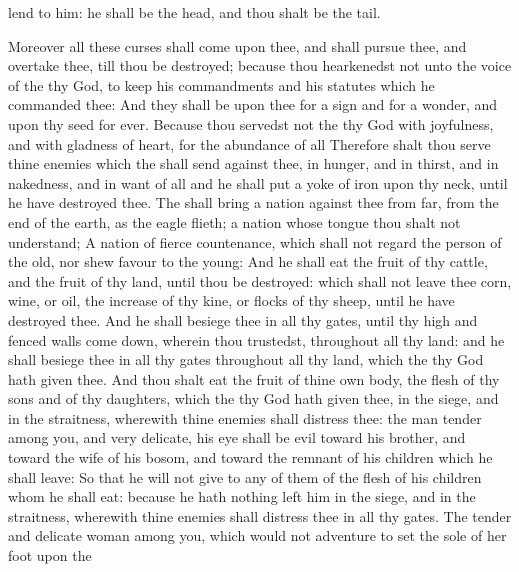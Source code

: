 {lend to him: he shall be the
head, and thou shalt be the
tail.
\par }{\PP {}Moreover all these
curses shall
come upon thee, and shall
pursue thee, and
overtake thee, till thou be
destroyed; because thou
hearkenedst not unto the
voice of the
{} thy
God, to
keep his
commandments and his
statutes which he
commanded thee:
And they shall be upon thee for a
sign and for a
wonder, and upon thy
seed
for
ever.
Because thou
servedst not the
{} thy
God with
joyfulness, and with
gladness of
heart, for the
abundance of all
{}
Therefore shalt thou
serve thine
enemies which the
{} shall
send against thee, in
hunger, and in
thirst, and in
nakedness, and in
want of all
{} and he shall
put a
yoke of
iron upon thy
neck, until he have
destroyed thee.
The
{} shall
bring a
nation against thee from
far, from the
end of the
earth,
{} as the
eagle
flieth; a
nation whose
tongue thou shalt not
understand;
A
nation of
fierce
countenance, which shall not
regard the
person of the
old, nor shew
favour to the
young:
And he shall
eat the
fruit of thy
cattle, and the
fruit of thy
land, until thou be
destroyed: which
{} shall not
leave thee
{}
corn,
wine, or
oil,
{} the
increase of thy
kine, or
flocks of thy
sheep, until he have
destroyed thee.
And he shall
besiege thee in all thy
gates, until thy
high and
fenced
walls come
down,
wherein thou
trustedst, throughout all thy
land: and he shall
besiege thee in all thy
gates throughout all thy
land, which the
{} thy
God hath
given thee.
And thou shalt
eat the
fruit of thine own
body, the
flesh of thy
sons and of thy
daughters, which the
{} thy
God hath
given thee, in the
siege, and in the
straitness, wherewith thine
enemies shall
distress thee:
 the
man
{}
tender among you, and
very
delicate, his
eye shall be
evil toward his
brother, and toward the
wife of his
bosom, and toward the
remnant of his
children which he shall
leave:
So that he will not
give to
any of them of the
flesh of his
children whom he shall
eat: because he hath nothing
left him in the
siege, and in the
straitness, wherewith thine
enemies shall
distress thee in all thy
gates.
The
tender and
delicate woman among you, which would not
adventure to
set the
sole of her
foot upon the
}
